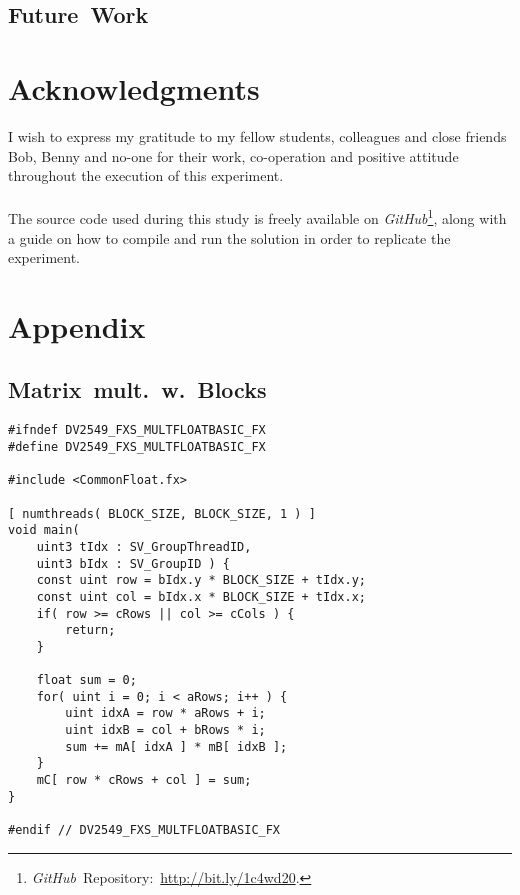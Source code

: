 \documentclass[fleqn,10pt]{SelfArx} %
\newlength{\tocsep}
\begin{document}
\subsection{Future~Work}
\label{sec:conclusion:futurework}

\section*{Acknowledgments} %
\label{sec:acknowledgments}
I wish to express my gratitude to my fellow students, colleagues and close friends Bob, Benny and no-one for their work, co-operation and positive attitude throughout the execution of this experiment. \\
\\
The source code used during this study is freely available on \textit{GitHub}\footnote{\textit{GitHub}~Repository:~\url{http://bit.ly/1c4wd20}.}, along with a guide on how to compile and run the solution in order to replicate the experiment.

\section*{Appendix}
\label{sec:appendix}
\subsection*{Matrix~mult.~w.~Blocks}
\begin{lstlisting}
#ifndef DV2549_FXS_MULTFLOATBASIC_FX
#define DV2549_FXS_MULTFLOATBASIC_FX

#include <CommonFloat.fx>

[ numthreads( BLOCK_SIZE, BLOCK_SIZE, 1 ) ]
void main(
	uint3 tIdx : SV_GroupThreadID,
	uint3 bIdx : SV_GroupID ) {
	const uint row = bIdx.y * BLOCK_SIZE + tIdx.y;
	const uint col = bIdx.x * BLOCK_SIZE + tIdx.x;
	if( row >= cRows || col >= cCols ) {
		return;
	}
        
	float sum = 0;
	for( uint i = 0; i < aRows; i++ ) {
		uint idxA = row * aRows + i;
		uint idxB = col + bRows * i;
		sum += mA[ idxA ] * mB[ idxB ];
	}
	mC[ row * cRows + col ] = sum;
}

#endif // DV2549_FXS_MULTFLOATBASIC_FX
\end{lstlisting}
\end{document}
